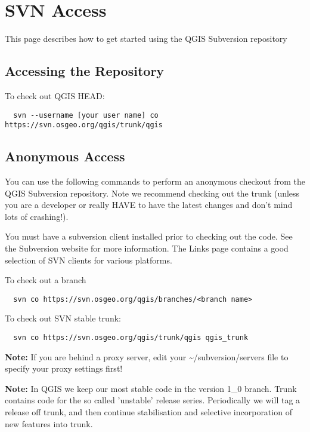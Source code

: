 \hypertarget{toc29}{}
\section{SVN Access}
This page describes how to get started using the QGIS Subversion repository

\hypertarget{toc30}{}
\subsection{Accessing the Repository}
To check out QGIS HEAD:

\begin{verbatim}
  svn --username [your user name] co https://svn.osgeo.org/qgis/trunk/qgis
\end{verbatim}

\hypertarget{toc31}{}
\subsection{Anonymous Access}
You can use the following commands to perform an anonymous checkout from the
QGIS Subversion repository.  Note we recommend checking out the trunk (unless
you are a developer or really HAVE to have the latest changes and don't mind
lots of crashing!).

You must have a subversion client installed prior to checking out the code. See
the Subversion website for more information. The Links page contains a good
selection of SVN clients for various platforms.

To check out a branch

\begin{verbatim}
  svn co https://svn.osgeo.org/qgis/branches/<branch name>
\end{verbatim}

To check out SVN stable trunk:

\begin{verbatim}
  svn co https://svn.osgeo.org/qgis/trunk/qgis qgis_trunk
\end{verbatim}

\textbf{Note:} If you are behind a proxy server, edit your \~{}/subversion/servers
file to specify your proxy settings first!

\textbf{Note:} In QGIS we keep our most stable code in the version 1\_0 branch.
Trunk contains code for the so called 'unstable' release series. Periodically
we will tag a release off trunk, and then continue stabilisation and selective
incorporation of new features into trunk.

